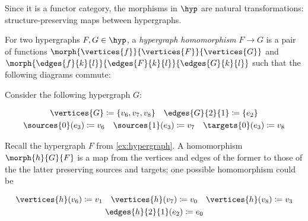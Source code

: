 Since it is a functor category, the morphisms in \(\hyp\) are natural
transformations: structure-preserving maps between hypergraphs.

\begin{definition}\label{def:hypergraph-homomorphism}
    For two hypergraphs \(F, G \in \hyp\), a \emph{hypergraph homomorphism}
    \(F \to G\) is a pair of functions
    \(\morph{\vertices{f}}{\vertices{F}}{\vertices{G}}\) and
    \(\morph{\edges{f}{k}{l}}{\edges{F}{k}{l}}{\edges{G}{k}{l}}\) such that the
    following diagrams commute:
    
\end{definition}
%
\begin{example}\label{ex:hypergraph-homomorphism}
    Consider the following hypergraph \(G\):
    \begin{center}
        \begin{minipage}{0.75\textwidth}
            \begin{gather*}
                \vertices{G} \coloneqq \{v_6,v_7,v_8\}
                \quad
                \edges{G}{2}{1} \coloneqq \{e_2\}
                \\
                \sources{0}(e_3) \coloneqq v_6
                \quad
                \sources{1}(e_3) \coloneqq v_7
                \quad
                \targets{0}(e_3) \coloneqq v_8
            \end{gather*}
        \end{minipage}
        \begin{minipage}{0.2\textwidth}
            \centering

            \vspace{1.5em}

        \end{minipage}
    \end{center}

    Recall the hypergraph \(F\) from \cref{ex:hypergraph}.
    A homomorphism \(\morph{h}{G}{F}\) is a map from the vertices and edges
    of the former to those of the the latter preserving sources and targets;
    one possible homomorphism could be
    \begin{center}
        \begin{minipage}{0.75\textwidth}
            \begin{gather*}
                \vertices{h}(v_6) \coloneqq v_1
                \quad
                \vertices{h}(v_7) \coloneqq v_0
                \quad
                \vertices{h}(v_8) \coloneqq v_3
                \\
                \edges{h}{2}{1}(e_2) \coloneqq e_0
            \end{gather*}
        \end{minipage}
        \begin{minipage}{0.2\textwidth}
            \centering


\end{minipage}
\end{center}
\end{example}
